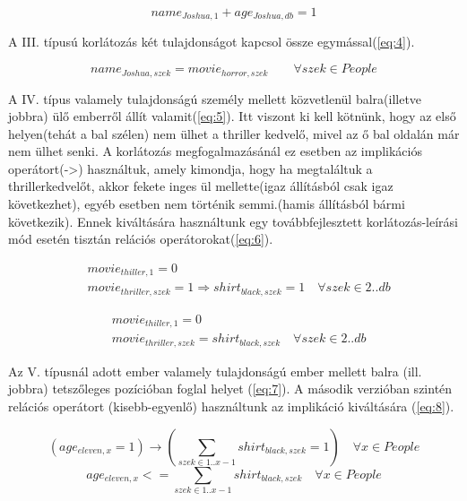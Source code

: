 \documentclass[12pt,a4paper,twoside, openright]{report}
\begin{document}
    \begin{equation}  \label{eq:3}
    name_{Joshua,1} + age_{Joshua,db} =1
    \end{equation}

    A III. típusú korlátozás két tulajdonságot kapcsol össze egymással(\ref{eq:4}).

    \begin{equation} \label{eq:4}
    name_{Joshua,szek} = movie_{horror,szek} \qquad \forall szek \in People
    \end{equation}

    A IV. típus valamely tulajdonságú személy mellett közvetlenül balra(illetve jobbra) ülő emberről állít valamit(\ref{eq:5}).
    Itt viszont ki kell kötnünk, hogy az első helyen(tehát a bal szélen) nem ülhet a thriller kedvelő, mivel az ő bal oldalán már nem ülhet senki.
    A korlátozás megfogalmazásánál ez esetben az implikációs operátort(->) használtuk, amely kimondja, hogy ha megtaláltuk a thrillerkedvelőt, akkor fekete inges ül mellette(igaz állításból csak igaz következhet), egyéb esetben nem történik semmi.(hamis állításból bármi következik).
    Ennek kiváltására használtunk egy továbbfejlesztett korlátozás-leírási mód esetén tisztán relációs operátorokat(\ref{eq:6}).

    \begin{equation} \label{eq:5}
    \begin{aligned}
    &movie_{thiller,1}=0 \\
    &movie_{thriller,szek}=1 \Rightarrow shirt_{black,szek}=1 \quad \forall szek \in 2..db
    \end{aligned}
    \end{equation}
    
    \begin{equation} \label{eq:6}
    \begin{aligned}
    &movie_{thiller,1}=0 \\
    &movie_{thriller,szek}= shirt_{black,szek} \quad \forall szek\in 2..db
    \end{aligned}
    \end{equation}

    Az V. típusnál adott ember valamely tulajdonságú ember mellett balra (ill. jobbra) tetszőleges pozícióban foglal helyet (\ref{eq:7}).
    A második verzióban szintén relációs operátort (kisebb-egyenlő) használtunk az implikáció kiváltására (\ref{eq:8}).

    \begin{equation} \label{eq:7}
    (age_{eleven,x}=1) \rightarrow (\sum_{ szek \in 1..x-1 } shirt_{black,szek}=1) \quad \forall x \in People
    \end{equation}
    \begin{equation} \label{eq:8}
    age_{eleven,x} <= \sum_{szek \in 1..x-1} shirt_{black,szek} \quad \forall x \in People
     \end{equation}
\end{document}
